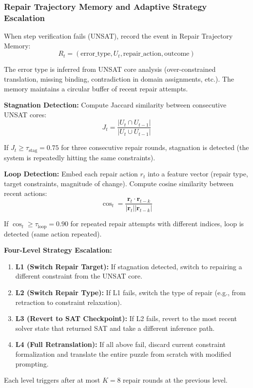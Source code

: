\subsubsection{Repair Trajectory Memory and Adaptive Strategy Escalation}

When step verification fails (UNSAT), record the event in Repair Trajectory Memory:
\[
R_t = (\text{error\_type}, U_t, \text{repair\_action}, \text{outcome})
\]

The error type is inferred from UNSAT core analysis (over-constrained translation, missing binding, contradiction in domain assignments, etc.). The memory maintains a circular buffer of recent repair attempts.

\textbf{Stagnation Detection:} Compute Jaccard similarity between consecutive UNSAT cores:
\[
J_t = \frac{|U_t \cap U_{t-1}|}{|U_t \cup U_{t-1}|}
\]

If $J_t \geq \tau_{\text{stag}} = 0.75$ for three consecutive repair rounds, stagnation is detected (the system is repeatedly hitting the same constraints).

\textbf{Loop Detection:} Embed each repair action $r_t$ into a feature vector (repair type, target constraints, magnitude of change). Compute cosine similarity between recent actions:
\[
\cos_t = \frac{\mathbf{r}_t \cdot \mathbf{r}_{t-k}}{|\mathbf{r}_t| |\mathbf{r}_{t-k}|}
\]

If $\cos_t \geq \tau_{\text{loop}} = 0.90$ for repeated repair attempts with different indices, loop is detected (same action repeated).

\textbf{Four-Level Strategy Escalation:}
\begin{enumerate}
    \item \textbf{L1 (Switch Repair Target):} If stagnation detected, switch to repairing a different constraint from the UNSAT core.
    \item \textbf{L2 (Switch Repair Type):} If L1 fails, switch the type of repair (e.g., from retraction to constraint relaxation).
    \item \textbf{L3 (Revert to SAT Checkpoint):} If L2 fails, revert to the most recent solver state that returned SAT and take a different inference path.
    \item \textbf{L4 (Full Retranslation):} If all above fail, discard current constraint formalization and translate the entire puzzle from scratch with modified prompting.
\end{enumerate}

Each level triggers after at most $K = 8$ repair rounds at the previous level.


